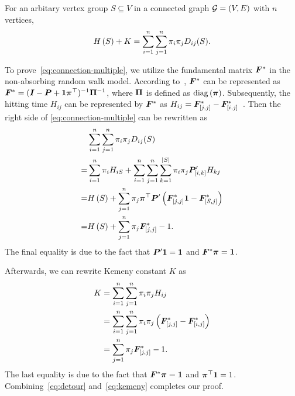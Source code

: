 \documentclass[10pt,twocolumn,twoside]{IEEEtran}
\begin{document}
\begin{theorem}\label{thm:connection-multiple}
    For an arbitary vertex group \(S\subseteq V\) in a connected graph \(\mathcal{G}=(V,E)\) with \(n\) vertices,
    \begin{equation}\label{eq:connection-multiple}
        H\left(S\right)+K=\sum_{i=1}^n\sum_{j=1}^n\pi_i\pi_jD_{ij}(S).
    \end{equation}
\end{theorem}
\begin{IEEEproof}
    To prove~\eqref{eq:connection-multiple}, we utilize the fundamental matrix \(\boldsymbol{F}^*\) in the non-absorbing random walk model.
    According to~\cite{BoRaZh11}, \(\boldsymbol{F}^*\) can be represented as \(\boldsymbol{F}^*=(\boldsymbol{I}-\boldsymbol{P}+\boldsymbol{1}\boldsymbol{\pi}^\top)^{-1}\boldsymbol{\Pi}^{-1}\), where \(\boldsymbol{\Pi}\) is defined as \(\rm{diag}\left( \boldsymbol{\pi} \right)\).
    Subsequently, the hitting time \(H_{ij}\) can be represented by \(\boldsymbol{F}^*\) as \(H_{ij}=\boldsymbol{F}^*_{[j,j]}-\boldsymbol{F}^*_{[i,j]}\)~\cite{BoRaZh11}.
    Then the right side of \eqref{eq:connection-multiple} can be rewritten as
    \begin{equation}\label{eq:detour}
        \begin{split}
            &\sum_{i=1}^n\sum_{j=1}^n\pi_i\pi_jD_{ij}(S)\\
            =&\sum_{i=1}^n\pi_i H_{iS}+\sum_{i=1}^n\sum_{j=1}^n\sum_{k=1}^{\left|S \right|}\pi_i\pi_j\boldsymbol{P}'_{[i,k]}H_{kj}  \\
            =&H\left(S\right)+\sum_{j=1}^n\pi_j\boldsymbol{\pi}^\top\boldsymbol{P}'\left( \boldsymbol{F}^*_{[j,j]}\boldsymbol{1}-\boldsymbol{F}^*_{[S,j]} \right)                        \\
            =&H\left(S\right)+\sum_{j=1}^n\pi_j\boldsymbol{F}^*_{[j,j]}-1.
        \end{split}
    \end{equation}
    The final equality is due to the fact that \(\boldsymbol{P}'\boldsymbol{1}=\boldsymbol{1}\) and \(\boldsymbol{F}^*\boldsymbol{\pi}=\boldsymbol{1}\).

    Afterwards, we can rewrite Kemeny constant \(K\) as
    \begin{equation}\label{eq:kemeny}
        \begin{split}
            K&=\sum_{i=1}^n\sum_{j=1}^n\pi_i\pi_jH_{ij}\\
            &=\sum_{i=1}^n\sum_{j=1}^n\pi_i\pi_j\left( \boldsymbol{F}^*_{[j,j]}-\boldsymbol{F}^*_{[i,j]} \right)\\
            &=\sum_{j=1}^n\pi_j\boldsymbol{F}^*_{[j,j]}-1.
        \end{split}
    \end{equation}
    The last equality is due to the fact that \(\boldsymbol{F}^*\boldsymbol{\pi}=\boldsymbol{1}\) and \(\boldsymbol{\pi}^\top\boldsymbol{1}=1\).
    Combining~\eqref{eq:detour} and~\eqref{eq:kemeny} completes our proof.
\end{IEEEproof}
\end{document}
